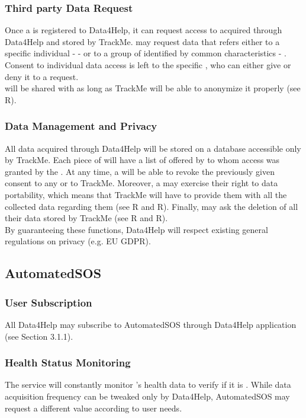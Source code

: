 \documentclass[../../rasd.tex]{subfiles}
\begin{document}
				\subsubsection{Third party Data Request}
				Once a  is registered to Data4Help, it can request access to  acquired through Data4Help and stored by TrackMe.  may request data that refers either to a specific individual -  - or to a group of  identified by common characteristics - .\\
				Consent to individual data access is left to the specific , who can either give or deny it to a  request.\\
				 will be shared with  as long as TrackMe will be able to anonymize it properly (see R).

				\subsubsection{Data Management and Privacy}
				All data acquired through Data4Help will be stored on a database accessible only by TrackMe. Each piece of  will have a list of  offered by  to whom access was granted by the . At any time, a  will be able to revoke the previously given consent to any  or to TrackMe. Moreover, a  may exercise their right to data portability, which means that TrackMe will have to provide them with all the collected data regarding them (see R and R). Finally,  may ask the deletion of all their data stored by TrackMe (see R and R).\\
				By guaranteeing these functions, Data4Help will respect existing general regulations on privacy (e.g. EU GDPR).
			
			\subsection{AutomatedSOS}
				
				\subsubsection{User Subscription}
				All Data4Help  may subscribe to AutomatedSOS through Data4Help application (see Section 3.1.1).
				
				\subsubsection{Health Status Monitoring}
				The service will constantly monitor 's health data to verify if it is . While data acquisition frequency can be tweaked only by Data4Help, AutomatedSOS may request a different value according to user needs.
				
\end{document}
